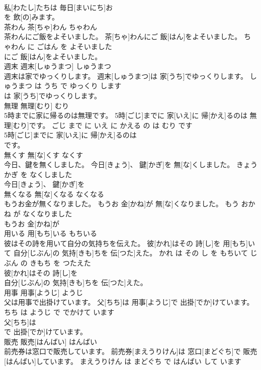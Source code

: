 \documentclass[8pt]{extreport}
\begin{document}
\begin{CJK}{UTF8}{min}
\\	私[わたし]たちは 毎日[まいにち]お
\\	を 飲[の]みます。			
\\	茶わん	茶[ちゃ]わん	ちゃわん	
\\	茶わんにご飯をよそいました。	茶[ちゃ]わんにご 飯[はん]をよそいました。	ちゃわん に ごはん を よそいました	
\\	にご 飯[はん]をよそいました。			
\\	週末	週末[しゅうまつ]	しゅうまつ	
\\	週末は家でゆっくりします。	週末[しゅうまつ]は 家[うち]でゆっくりします。	しゅうまつ は うち で ゆっくり します	
\\	は 家[うち]でゆっくりします。			
\\	無理	無理[むり]	むり	
\\	5時までに家に帰るのは無理です。	5時[ごじ]までに 家[いえ]に 帰[かえ]るのは 無理[むり]です。	ごじ まで に いえ に かえる の は むり です	
\\	5時[ごじ]までに 家[いえ]に 帰[かえ]るのは
\\	です。			
\\	無くす	無[な]くす	なくす	
\\	今日、鍵を無くしました。	今日[きょう]、 鍵[かぎ]を 無[な]くしました。	きょう かぎ を なくしました	
\\	今日[きょう]、 鍵[かぎ]を
\\	無くなる	無[な]くなる	なくなる	
\\	もうお金が無くなりました。	もうお 金[かね]が 無[な]くなりました。	もう おかね が なくなりました	
\\	もうお 金[かね]が
\\	用いる	用[もち]いる	もちいる	
\\	彼はその詩を用いて自分の気持ちを伝えた。	彼[かれ]はその 詩[し]を 用[もち]いて 自分[じぶん]の 気持[きも]ちを 伝[つた]えた。	かれ は その し を もちいて じぶん の きもち を つたえた	
\\	彼[かれ]はその 詩[し]を
\\	自分[じぶん]の 気持[きも]ちを 伝[つた]えた。			
\\	用事	用事[ようじ]	ようじ	
\\	父は用事で出掛けています。	父[ちち]は 用事[ようじ]で 出掛[でか]けています。	ちち は ようじ で でかけて います	
\\	父[ちち]は
\\	で 出掛[でか]けています。			
\\	販売	販売[はんばい]	はんばい	
\\	前売券は窓口で販売しています。	前売券[まえうりけん]は 窓口[まどぐち]で 販売[はんばい]しています。	まえうりけん は まどぐち で はんばい して います	

\end{CJK}
\end{document}
